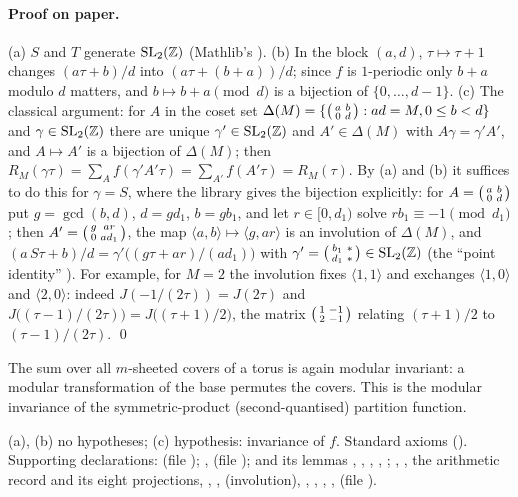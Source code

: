 \paragraph{Proof on paper.}  (a) $S$ and $T$ generate $\mathrm{SL}_2(\mathbb{Z})$ (Mathlib's ).  (b) In the block
$(a,d)$, $\tau\mapsto\tau+1$ changes $(a\tau+b)/d$ into $(a\tau+(b+a))/d$; since $f$ is $1$-periodic only $b+a$ modulo $d$
matters, and $b\mapsto b+a\pmod d$ is a bijection of $\{0,\dots,d-1\}$.  (c) The classical argument: for $A$ in the coset
set $\Delta(M)=\{\left(\begin{smallmatrix}a&b\\0&d\end{smallmatrix}\right):ad=M,0\le b<d\}$ and $\gamma\in\mathrm{SL}_2(\mathbb{Z})$ there are unique $\gamma'\in\mathrm{SL}_2(\mathbb{Z})$ and
$A'\in\Delta(M)$ with $A\gamma=\gamma'A'$, and $A\mapsto A'$ is a bijection of $\Delta(M)$; then
$R_M(\gamma\tau)=\sum_Af(\gamma'A'\tau)=\sum_{A'}f(A'\tau)=R_M(\tau)$.  By (a) and (b) it suffices to do this for $\gamma=S$, where
the library gives the bijection explicitly: for $A=\left(\begin{smallmatrix}a&b\\0&d\end{smallmatrix}\right)$ put $g=\gcd(b,d)$, $d=gd_1$, $b=gb_1$, and let $r\in[0,d_1)$
solve $rb_1\equiv-1\pmod{d_1}$; then $A'=\left(\begin{smallmatrix}g&ar\\0&ad_1\end{smallmatrix}\right)$, the map $\langle a,b\rangle\mapsto\langle g,ar\rangle$ is an
involution of $\Delta(M)$, and $(a\,S\tau+b)/d=\gamma'\bigl((g\tau+ar)/(ad_1)\bigr)$ with
$\gamma'=\left(\begin{smallmatrix}b_1&*\\d_1&*\end{smallmatrix}\right)\in\mathrm{SL}_2(\mathbb{Z})$ (the ``point identity'' ).  For example, for
$M=2$ the involution fixes $\langle1,1\rangle$ and exchanges $\langle1,0\rangle$ and $\langle2,0\rangle$: indeed
$J(-1/(2\tau))=J(2\tau)$ and $J\bigl((\tau-1)/(2\tau)\bigr)=J\bigl((\tau+1)/2\bigr)$, the matrix $\left(\begin{smallmatrix}1&-1\\2&-1\end{smallmatrix}\right)$ relating
$(\tau+1)/2$ to $(\tau-1)/(2\tau)$. \qed
\begin{physics}
The sum over all $m$-sheeted covers of a torus is again modular invariant: a modular transformation of the base permutes
the covers.  This is the modular invariance of the symmetric-product (second-quantised) partition function.
\end{physics}
\begin{status}
(a), (b) no hypotheses; (c) hypothesis: invariance of $f$.  Standard axioms ().
Supporting declarations:  (file ); ,
 (file );  and its lemmas
, , , ,
; , , the arithmetic record  and its
eight projections, , ,  (involution), ,
, , ,  (file
).
\end{status}

